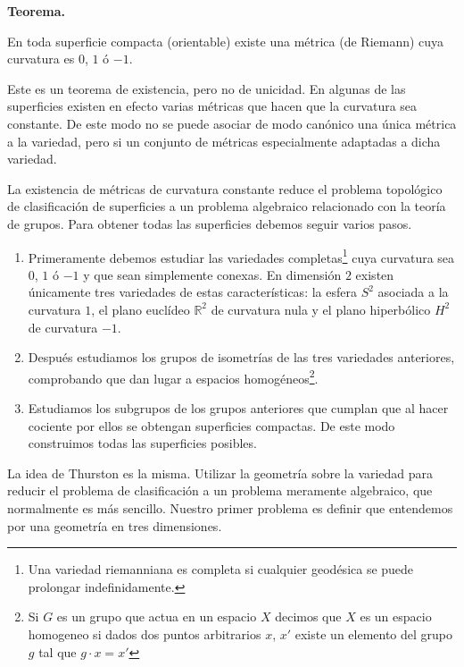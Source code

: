 \documentclass[a4paper, 12pt]{article}
\newcommand{\R}{\mathbb{R}}%
\begin{document}
\smallskip

{\bf Teorema.} \begin{it}
En toda superficie compacta (orientable) existe una métrica (de Riemann) cuya curvatura  es $0$, $1$ ó $-1$.
\end{it}

\smallskip

Este es un teorema de existencia, pero no de unicidad.  En algunas de las superficies existen en efecto varias métricas que hacen que la curvatura  sea constante.  De este modo no se puede asociar de modo canónico una única métrica a la variedad, pero si un conjunto de métricas especialmente adaptadas a dicha variedad.

 La existencia de métricas de curvatura constante reduce el problema topológico de clasificación de superficies a un problema algebraico relacionado con la teoría de grupos. 
 Para obtener todas las superficies debemos seguir varios pasos.
 
 \begin{enumerate}[\indent 1.- ]
 
 \item Primeramente debemos estudiar las variedades completas\footnote{Una variedad riemanniana es completa si cualquier geodésica se puede prolongar indefinidamente.} cuya curvatura sea $0$, $1$ ó $-1$ y que sean simplemente conexas.  En dimensión $2$ existen únicamente tres variedades de estas características: la esfera $S^2$ asociada a la curvatura $1$, el plano euclídeo $\R^2$ de curvatura nula y el plano hiperbólico $H^2$ de curvatura $-1$.
 
 
 \item Después estudiamos los grupos de isometrías de las tres variedades anteriores, comprobando que dan lugar a espacios homogéneos\footnote{Si $G$ es un grupo que actua en un espacio $X$ decimos que $X$ es un espacio homogeneo si dados dos puntos arbitrarios $x$, $x'$ existe un elemento del grupo $g$ tal que $g \cdot x = x'$}.
 
 
 \item Estudiamos los subgrupos de los grupos anteriores que cumplan que al hacer cociente por ellos se obtengan superficies compactas.  De este modo construimos todas las superficies posibles.
 
 
 \end{enumerate}
 

La idea de Thurston es la misma.  Utilizar la geometría sobre la variedad para reducir el problema de clasificación a un problema meramente algebraico, que normalmente es más sencillo. Nuestro primer problema es definir que entendemos por una geometría en tres dimensiones.
\end{document}
